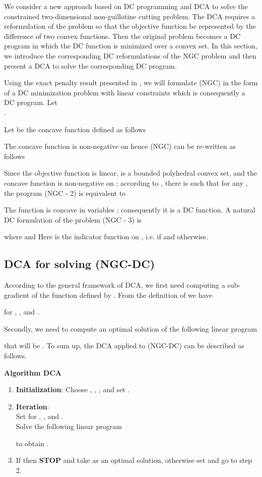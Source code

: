 \documentclass{iesmart}
\begin{document}
We consider a new approach based on DC programming and DCA to
solve the constrained two-dimensional non-guillotine cutting
problem. The DCA requires a reformulation of the problem so that
the objective function be represented by the difference of two
convex functions. Then the original problem becomes a DC program
in which the DC function is minimized over a convex set. In this
section, we introduce the corresponding DC reformulations of the
NGC problem and then present a DCA to solve the corresponding DC
program.

Using the exact penalty result presented in \cite{lethi2005b}, we
will formulate (NGC) in the form of a DC minimization problem with
linear constraints which is consequently a DC program. Let\\
.

Let  be the concave function defined as follows


The concave function  is non-negative on  hence
(NGC) can be re-written as follows
 

Since the objective function is linear,  is a bounded
polyhedral convex set, and the concave function  is
non-negative on ; according to \cite{lethi2005b}, there is
 such that for any , the program (NGC - 2)
is equivalent to


The function  is concave in variables ; consequently it is
a DC function. A natural DC formulation of the problem (NGC - 3)
is

 where
 and
 Here  is the indicator function on , i.e.  if  and  otherwise.

\subsection{DCA for solving (NGC-DC)}
According to the general framework of DCA, we first need computing
a sub-gradient of the function  defined by .
 From the definition of  we have


for , , and .

Secondly, we need to compute an optimal solution of the following
linear program

that will be . To sum up, the DCA applied to (NGC-DC)
can be described as follows.

\noindent \textbf{Algorithm DCA}
\begin{enumerate}
    \item \textbf{Initialization}: Choose , , , and set
    .\item \textbf{Iteration}:\\
    Set  for , , and .\\
    Solve the following linear program
    
    to obtain .\\
    \item If  then \textbf{STOP} and take  as an optimal
    solution, otherwise set
     and go to step 2.
\end{enumerate}
\end{document}
